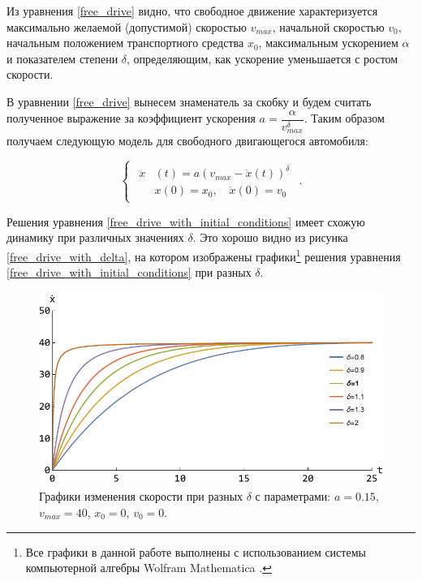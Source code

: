 \documentclass[12pt, a4paper]{extarticle}
\numberwithin{equation}{section}
\begin{document}
Из уравнения \eqref{free_drive} видно, что свободное движение характеризуется максимально желаемой (допустимой) скоростью $v_{max}$, начальной скоростью $v_{0}$, начальным положением транспортного средства $x_0$, максимальным ускорением $\alpha$ и показателем степени $\delta$, определяющим, как ускорение уменьшается с ростом скорости.

В уравнении \eqref{free_drive} вынесем знаменатель за скобку и будем считать полученное выражение за коэффициент ускорения $a=\dfrac{\alpha}{v_{max}^\delta}$. Таким образом получаем следующую модель для свободного двигающегося автомобиля:

\begin{equation} \label{free_drive_with_initial_conditions}
\begin{cases}
\begin{split}
\ddot{x}&(t) = a\left( v_{max} - \dot{x}(t)\right)^\delta \\
&x(0)=x_0, \quad \dot{x}(0)=v_0
\end{split}
\end{cases}.
\end{equation}

Решения уравнения \eqref{free_drive_with_initial_conditions} имеет схожую динамику при различных значениях $\delta$. Это хорошо видно из рисунка \eqref{free_drive_with_delta}, на котором изображены графики\footnote{Все графики в данной работе выполнены с использованием системы компьютерной алгебры Wolfram Mathematica \cite{WolframMathematica}.} решения уравнения \eqref{free_drive_with_initial_conditions} при разных $\delta$.

\begin{figure}[h!]
	\begin{center}
		\begin{minipage}[h!]{0.48\linewidth}
			\includegraphics[width=1\linewidth,height=0.2\textheight]
			{Images/free_drive_speed_with_different_delta.pdf}
		\end{minipage}
		\caption{Графики изменения скорости при разных $\delta$ с параметрами: $a=0.15$, $v_{max}=40$, $x_0=0$, $v_0=0$.}
		\label{free_drive_with_delta}
	\end{center}
\end{figure}
\end{document}
